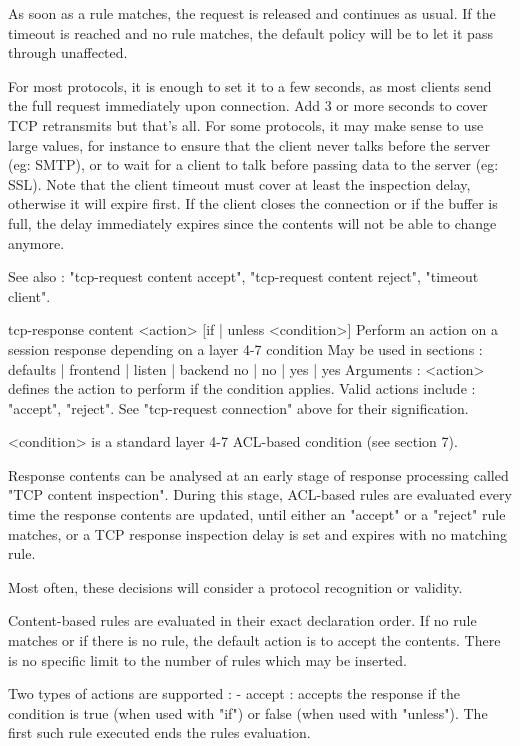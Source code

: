   As soon as a rule matches, the request is released and continues as usual. If
  the timeout is reached and no rule matches, the default policy will be to let
  it pass through unaffected.

  For most protocols, it is enough to set it to a few seconds, as most clients
  send the full request immediately upon connection. Add 3 or more seconds to
  cover TCP retransmits but that's all. For some protocols, it may make sense
  to use large values, for instance to ensure that the client never talks
  before the server (eg: SMTP), or to wait for a client to talk before passing
  data to the server (eg: SSL). Note that the client timeout must cover at
  least the inspection delay, otherwise it will expire first. If the client
  closes the connection or if the buffer is full, the delay immediately expires
  since the contents will not be able to change anymore.

  See also : "tcp-request content accept", "tcp-request content reject",
             "timeout client".


tcp-response content <action> [{if | unless} <condition>]
  Perform an action on a session response depending on a layer 4-7 condition
  May be used in sections :   defaults | frontend | listen | backend
                                 no    |    no    |   yes  |   yes
  Arguments :
    <action>    defines the action to perform if the condition applies. Valid
                actions include : "accept", "reject".
                See "tcp-request connection" above for their signification.

    <condition> is a standard layer 4-7 ACL-based condition (see section 7).

  Response contents can be analysed at an early stage of response processing
  called "TCP content inspection". During this stage, ACL-based rules are
  evaluated every time the response contents are updated, until either an
  "accept" or a "reject" rule matches, or a TCP response inspection delay is
  set and expires with no matching rule.

  Most often, these decisions will consider a protocol recognition or validity.

  Content-based rules are evaluated in their exact declaration order. If no
  rule matches or if there is no rule, the default action is to accept the
  contents. There is no specific limit to the number of rules which may be
  inserted.

  Two types of actions are supported :
    - accept :
        accepts the response if the condition is true (when used with "if")
        or false (when used with "unless"). The first such rule executed ends
        the rules evaluation.

